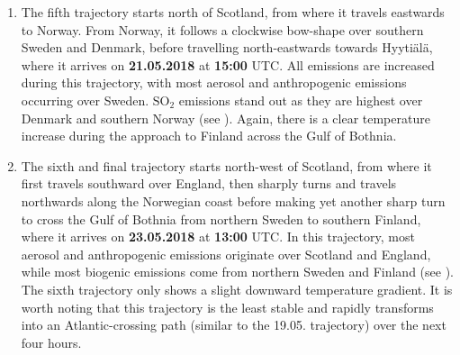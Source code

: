 \begin{enumerate}
    \item The fifth trajectory starts north of Scotland, from where it travels eastwards to Norway. From Norway, it follows a clockwise bow-shape over southern Sweden and Denmark, before travelling north-eastwards towards Hyyti\"al\"a, where it arrives on \textbf{21.05.2018} at \textbf{15:00} UTC. All emissions are increased during this trajectory, with most aerosol and anthropogenic emissions occurring over Sweden. $\text{SO}_2$ emissions stand out as they are highest over Denmark and southern Norway (see ). Again, there is a clear temperature increase during the approach to Finland across the Gulf of Bothnia.
    \item The sixth and final trajectory starts north-west of Scotland, from where it first travels southward over England, then sharply turns and travels northwards along the Norwegian coast before making yet another sharp turn to cross the Gulf of Bothnia from northern Sweden to southern Finland, where it arrives on \textbf{23.05.2018} at \textbf{13:00} UTC. In this trajectory, most aerosol and anthropogenic emissions originate over Scotland and England, while most biogenic emissions come from northern Sweden and Finland (see ). The sixth trajectory only shows a slight downward temperature gradient. It is worth noting that this trajectory is the least stable and rapidly transforms into an Atlantic-crossing path (similar to the 19.05. trajectory) over the next four hours.
\end{enumerate}

